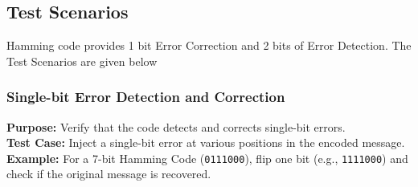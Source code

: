 \documentclass{article}
\numberwithin{equation}{section}
\numberwithin{figure}{section}
\numberwithin{table}{section}
\begin{document}

            
        

            
            
        

\pagebreak
\subsection{Test Scenarios}
Hamming code provides 1 bit Error Correction and 2 bits of Error Detection. The Test Scenarios are given below

\subsubsection{Single-bit Error Detection and Correction}
\textbf{Purpose:} Verify that the code detects and corrects single-bit errors. \\
\textbf{Test Case:} Inject a single-bit error at various positions in the encoded message. \\
\textbf{Example:} For a 7-bit Hamming Code (\texttt{0111000}), flip one bit (e.g., \texttt{1111000}) and check if the original message is recovered.
\end{document}
